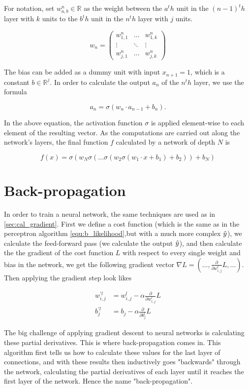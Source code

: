 For notation, set $w^n_{a, b} \in \mathbb{R}$ as the weight between the $a^th$ unit in the $(n - 1)^th$ layer with $k$ units to the $b^th$ unit in the $n^th$ layer with $j$ units.

\begin{equation}
  w_n = \begin{pmatrix}
    w^n_{1, 1} & \ldots & w^n_{1, k} \\
    \vdots & \ddots & \vdots \\
    w^n_{j, 1} & \ldots & w^n_{j, k}
  \end{pmatrix}
\end{equation}

The bias can be added as a dummy unit with input $x_{n+1} = 1$, which is a constant $b \in \mathbb{R}^j$. In order to calculate the output $a_n$ of the $n^th$ layer, we use the formula

$$
a_n = \sigma (w_n \cdot a_{n - 1} + b_n).
$$

In the above equation, the activation function $\sigma$ is applied element-wise to each element of the resulting vector. As the computations are carried out along the network's layers, the final function $f$ calculated by a network of depth $N$ is

$$
f(x) = \sigma(w_N\sigma(\ldots\sigma (w_2 \sigma(w_1 \cdot x + b_1) + b_2)) + b_N)
$$

\section{Back-propagation}
In order to train a neural network, the same techniques are used as in \cref{sec:cal_gradient}. First we define a cost function (which is the same as in the perceptron algorithm \cref{equ:b_likelihood},but with a much more complex $\hat{y}$), we calculate the feed-forward pass (we calculate the output $\hat{y}$), and then calculate the the gradient of the cost function $L$ with respect to every single weight and bias in the network, we get the following gradient vector $\nabla L = (\ldots, \frac{\partial}{\partial w^l_{i, j}} L, \ldots)$. Then applying the gradient step look likes

\begin{align*}
  w^{\prime l}_{i, j} &= w^l_{i, j} - \alpha  \frac{\partial}{\partial w^l_{i, j}} L\\
  b^{\prime l}_j &= b_j - \alpha \frac{\partial}{\partial b^l_j} L
\end{align*}

The big challenge of applying gradient descent to neural networks is calculating these partial derivatives.  This is where back-propagation comes in. This algorithm first tells us how to calculate these values for the last layer of connections, and with these results then inductively goes "backwards" through the network, calculating the partial derivatives of each layer until it reaches the first layer of the network. Hence the name "back-propagation".

